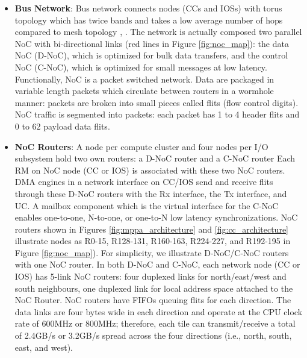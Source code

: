 \documentclass{sig-alternate-05-2015}
\begin{document}
\begin{itemize}
\item \textbf{Bus Network}:
Bus network connects nodes (CCs and IOSs) with torus topology \cite{dally2001route}
which has twice bands and takes a low average number of hops compared to mesh topology \cite{vangal200780}, \cite{taylor2002raw}.
The network is actually composed two parallel NoC with bi-directional links (red lines in Figure \ref{fig:noc_map}):
the data NoC (D-NoC), which is optimized for bulk data transfers, and the control NoC (C-NoC), which is optimized for small messages at low latency.
Functionally, NoC is a packet switched network.
Data are packaged in variable length packets which circulate between routers in a wormhole manner:
packets are broken into small pieces called flits (flow control digits).
NoC traffic is segmented into packets: each packet has 1 to 4 header flits and 0 to 62 payload data flits.

\item \textbf{NoC Routers}:
A node per compute cluster and four nodes per I/O subsystem hold two own routers: a D-NoC router and a C-NoC router
Each RM on NoC node (CC or IOS) is associated with these two NoC routers.
DMA engines in a network interface on CC/IOS send and receive flits through these D-NoC routers with the Rx interface, the Tx interface, and UC.
A mailbox component which is the virtual interface for the C-NoC enables one-to-one, N-to-one, or one-to-N low latency synchronizations.
NoC routers shown in Figures \ref{fig:mppa_architecture} and \ref{fig:cc_architecture} illustrate nodes as R0-15, R128-131, R160-163, R224-227, and R192-195 in Figure \ref{fig:noc_map}).
For simplicity, we illustrate D-NoC/C-NoC routers with one NoC router.
In both D-NoC and C-NoC, each network node (CC or IOS) has 5-link NoC routers:
four duplexed links for north/east/west and south neighbours, one duplexed link for local address space attached to the NoC Router.
NoC routers have FIFOs queuing flits for each direction.
The data links are four bytes wide in each direction and operate at the CPU clock rate of 600MHz or 800MHz;
therefore, each tile can transmit/receive a total of 2.4GB/s or 3.2GB/s spread across the four directions (i.e., north, south, east, and west).
\end{itemize}
\end{document}
